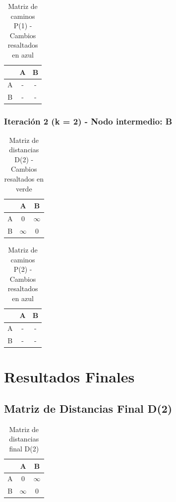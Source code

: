 \documentclass[12pt]{article}
\begin{document}
\begin{table}[h!]
\centering
\begin{tabular}{|c|c|c|}
\hline
 & A & B \\\hline
A & - & - \\\hline
B & - & - \\\hline
\end{tabular}
\caption{Matriz de caminos P(1) - Cambios resaltados en azul}
\end{table}

\clearpage
\subsubsection{Iteración 2 (k = 2) - Nodo intermedio: B}
\begin{table}[h!]
\centering
\begin{tabular}{|c|c|c|}
\hline
 & A & B \\\hline
A & 0 & $\infty$ \\\hline
B & $\infty$ & 0 \\\hline
\end{tabular}
\caption{Matriz de distancias D(2) - Cambios resaltados en verde}
\end{table}

\begin{table}[h!]
\centering
\begin{tabular}{|c|c|c|}
\hline
 & A & B \\\hline
A & - & - \\\hline
B & - & - \\\hline
\end{tabular}
\caption{Matriz de caminos P(2) - Cambios resaltados en azul}
\end{table}

\clearpage
\section{Resultados Finales}
\subsection{Matriz de Distancias Final D(2)}
\begin{table}[h!]
\centering
\begin{tabular}{|c|c|c|}
\hline
 & A & B \\\hline
A & 0 & $\infty$ \\\hline
B & $\infty$ & 0 \\\hline
\end{tabular}
\caption{Matriz de distancias final D(2)}
\end{table}
\end{document}
